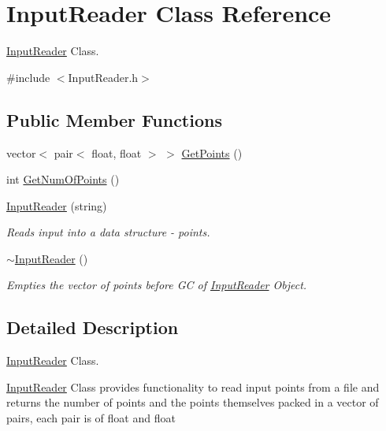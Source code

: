 \hypertarget{classInputReader}{}\section{Input\+Reader Class Reference}
\label{classInputReader}


\hyperlink{classInputReader}{Input\+Reader} Class.  




{\ttfamily \#include $<$Input\+Reader.\+h$>$}

\subsection*{Public Member Functions}
\begin{DoxyCompactItemize}
\item 
vector$<$ pair$<$ float, float $>$ $>$ \hyperlink{classInputReader_a1ec15e2c532aeac8fa7583e53a19c737}{Get\+Points} ()
\item 
int \hyperlink{classInputReader_a378297b623a4d8f738af1364e178fa5b}{Get\+Num\+Of\+Points} ()
\item 
\hyperlink{classInputReader_a26f4fba91c54fee7436185f39ab0e4cc}{Input\+Reader} (string)
\begin{DoxyCompactList}\small\item\em Reads input into a data structure -\/ points. \end{DoxyCompactList}\item 
\mbox{\label{classInputReader_a38875ce3bae818dd0836da36fb7ea891}} 
\hyperlink{classInputReader_a38875ce3bae818dd0836da36fb7ea891}{$\sim$\+Input\+Reader} ()
\begin{DoxyCompactList}\small\item\em Empties the vector of points before GC of \hyperlink{classInputReader}{Input\+Reader} Object. \end{DoxyCompactList}\end{DoxyCompactItemize}


\subsection{Detailed Description}
\hyperlink{classInputReader}{Input\+Reader} Class. 

\hyperlink{classInputReader}{Input\+Reader} Class provides functionality to read input points from a file and returns the number of points and the points themselves packed in a vector of pairs, each pair is of float and float 

